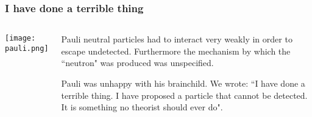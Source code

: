 \begin{frame}
\frametitle{I have done a terrible thing}

\begin{columns}
\texttt{[image: pauli.png]}
 
\begin{block}{}
Pauli neutral particles had to interact very weakly in order to escape undetected. Furthermore the mechanism by which the ``neutron" was produced was unspecified.

\vspace{0.5cm}

Pauli was unhappy with his brainchild. We wrote: ``I have  done a terrible thing. I have proposed a particle that cannot be detected. It is something no theorist should ever do". 

\end{block}
\end{columns}
\end{frame}

